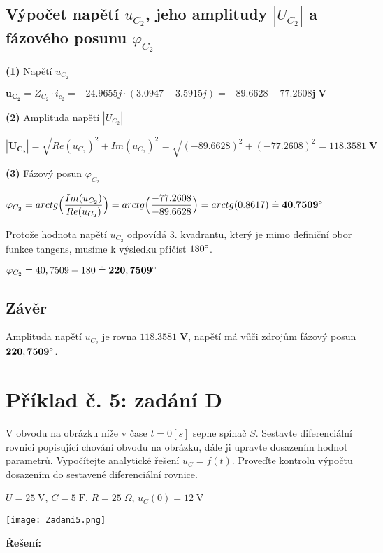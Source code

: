 \documentclass[a4paper,12pt]{article}
\begin{document}
\subsection{Výpočet napětí  $u_{C_2}$, jeho amplitudy $|U_{C_2}|$ a fázového posunu $\varphi_{C_2}$}\par
\hspace{1em}\textbf{(1)} Napětí $u_{C_2}$\par
$\mathbf{u_{C_2}}=Z_{C_2}\cdot i_{c_2}=-24.9655j\cdot (3.0947-3.5915j)=\mathbf{-89.6628-77.2608j\;\si{\volt}}$\par\vspace{1em}
\hspace{1em}\textbf{(2)} Amplituda napětí $|U_{C_2}|$\par
$\mathbf{|U_{C_2}|}= \sqrt{Re(u_{C_2})^2+Im(u_{C_2})^2}=\sqrt{(-89.6628)^2+(-77.2608)^2}=\mathbf{118.3581\;\si{\volt}}$\par\vspace{1em}
\hspace{1em}\textbf{(3)} Fázový posun $\varphi_{C_2}$\par
$\varphi_{C_2}=arctg\Big(\dfrac{Im(u_{C_2})}{Re(u_{C_2})}\Big)=arctg\Big(\dfrac{-77.2608}{-89.6628}\Big)=arctg(0.8617)\doteq \mathbf{40.7509\degree}$\par
Protože hodnota napětí $u_{C_2}$ odpovídá 3. kvadrantu, který je mimo definiční obor funkce tangens, musíme k výsledku přičíst $180\degree$.\par
$\varphi_{C_2}\doteq 40,7509+180\doteq \mathbf{220,7509\degree}$\par
\subsection{Závěr}\par
Amplituda napětí $u_{C_2}$ je rovna $\mathbf{118.3581 \;\si{\volt}}$, napětí má vůči zdrojům fázový posun $\mathbf{220,7509\degree}$.
\newpage
\section{Příklad č. 5: zadání D}
V obvodu na obrázku níže v čase $t=0[s]$ sepne spínač $S$. Sestavte diferenciální rovnici popisující chování obvodu na obrázku, dále ji upravte dosazením hodnot parametrů. Vypočítejte analytické řešení $u_C=f(t)$. Proveďte kontrolu výpočtu dosazením do sestavené diferenciální rovnice.\par\vspace{1.5em}
$U=25\;\si{\volt}$, $C=5\;\si{\farad}$, $R=25 \;\si{\Omega}$, $u_C(0)=12\;\si{\volt}$\vspace{1em}
\begin{center}
\texttt{[image: Zadani5.png]}
\end{center}\par\vspace{1em}\par\vspace{1em}
\newpage
\textbf{\large Řešení:}\vspace{-1.2em}
\end{document}

